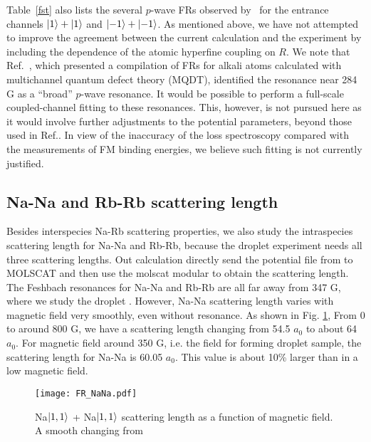 Table~\ref{fst} also lists the several $p$-wave FRs observed by~\cite{Wang2013} for the entrance channels $\ket{1}+\ket{1}$ and $\ket{-1}+\ket{-1}$. As mentioned above, we have not attempted to improve the agreement between the current calculation and the experiment by including the dependence of the atomic hyperfine coupling on $R$. We note that Ref.~\cite{Cui2018}, which presented a compilation of FRs for alkali atoms calculated with multichannel quantum defect theory (MQDT), identified the resonance near 284 G as a ``broad'' $p$-wave resonance. It would be possible to perform a full-scale coupled-channel fitting to these resonances. This, however, is not pursued here as it would involve further adjustments to the potential parameters, beyond those used in Ref.\cite{guo2021leehuangyang}. In view of the inaccuracy of the loss spectroscopy compared with the measurements of FM binding energies, we believe such fitting is not currently justified.

\subsection{Na-Na and Rb-Rb scattering length}

Besides interspecies Na-Rb scattering properties, we also study the intraspecies scattering length for Na-Na and Rb-Rb, because the droplet experiment needs all three scattering lengths. Out calculation directly send the potential file from \cite{} to MOLSCAT \cite{} and then use the molscat modular to obtain the scattering length. The Feshbach resonances for Na-Na and Rb-Rb are all far away from 347 G, where we study the droplet \cite{}. However, Na-Na scattering length varies with magnetic field very smoothly, even without resonance. As shown in Fig. \ref{FR_NaNa}, From 0 to around 800 G, we have a scattering length changing from 54.5 $a_0$ to about 64 $a_0$. For magnetic field around 350 G, i.e. the field for forming droplet sample, the scattering length for Na-Na is 60.05 $a_0$. This value is about 10\% larger than in a low magnetic field. 

\begin{figure}[htb]
\begin{center}
\texttt{[image: FR\_NaNa.pdf]}
\end{center}
\caption[Na$\ket{1,1}$ + Na$\ket{1,1}$ scattering length as a function of magnetic field]{Na$\ket{1,1}$ + Na$\ket{1,1}$ scattering length as a function of magnetic field. A smooth changing from }
\label{FR_NaNa}
\end{figure}

